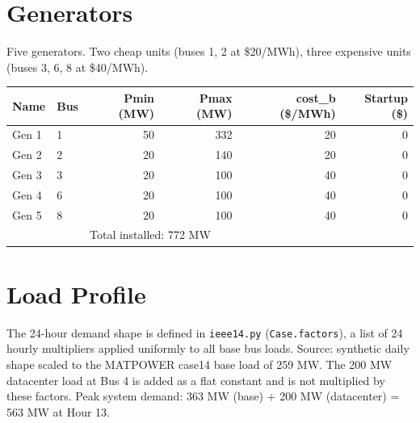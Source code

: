 \documentclass[11pt]{article}
\begin{document}
\section{Generators}

Five generators. Two cheap units (buses 1, 2 at \$20/MWh), three expensive units (buses 3, 6, 8 at \$40/MWh).

\begin{center}
\begin{tabular}{llrrrr}
\toprule
Name & Bus & Pmin (MW) & Pmax (MW) & cost\_b (\$/MWh) & Startup (\$) \\
\midrule
Gen 1 & 1 & 50  & 332 & 20 & 0 \\
Gen 2 & 2 & 20  & 140 & 20 & 0 \\
Gen 3 & 3 & 20  & 100 & 40 & 0 \\
Gen 4 & 6 & 20  & 100 & 40 & 0 \\
Gen 5 & 8 & 20  & 100 & 40 & 0 \\
\midrule
      &   & \multicolumn{2}{l}{Total installed: 772 MW} & & \\
\bottomrule
\end{tabular}
\end{center}

\section{Load Profile}

The 24-hour demand shape is defined in \texttt{ieee14.py} (\texttt{Case.factors}), a list of 24 hourly multipliers applied uniformly to all base bus loads. Source: synthetic daily shape scaled to the MATPOWER case14 base load of 259 MW. The 200 MW datacenter load at Bus 4 is added as a flat constant and is not multiplied by these factors. Peak system demand: 363 MW (base) + 200 MW (datacenter) = 563 MW at Hour 13.

\begin{center}
\end{center}
\end{document}
